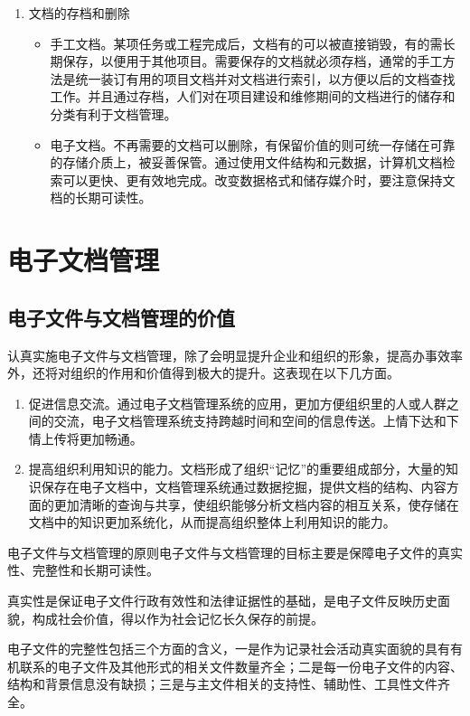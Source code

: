 \begin{enumerate}
    \item 文档的存档和删除
        \begin{itemize}
            \item  手工文档。某项任务或工程完成后，文档有的可以被直接销毁，有的需长期保存，以便用于其他项目。需要保存的文档就必须存档，通常的手工方法是统一装订有用的项目文档并对文档进行索引，以方便以后的文档查找工作。并且通过存档，人们对在项目建设和维修期间的文档进行的储存和分类有利于文档管理。
            \item  电子文档。不再需要的文档可以删除，有保留价值的则可统一存储在可靠的存储介质上，被妥善保管。通过使用文件结构和元数据，计算机文档检索可以更快、更有效地完成。改变数据格式和储存媒介时，要注意保持文档的长期可读性。
        \end{itemize}
    \end{enumerate}

\section {电子文档管理}

\subsection {电子文件与文档管理的价值}

    认真实施电子文件与文档管理，除了会明显提升企业和组织的形象，提高办事效率外，还将对组织的作用和价值得到极大的提升。这表现在以下几方面。

    \begin{enumerate}
        \item 促进信息交流。通过电子文档管理系统的应用，更加方便组织里的人或人群之间的交流，电子文档管理系统支持跨越时间和空间的信息传送。上情下达和下情上传将更加畅通。

        \item 提高组织利用知识的能力。文档形成了组织“记忆”的重要组成部分，大量的知识保存在电子文档中，文档管理系统通过数据挖掘，提供文档的结构、内容方面的更加清晰的查询与共享，使组织能够分析文档内容的相互关系，使存储在文档中的知识更加系统化，从而提高组织整体上利用知识的能力。
    \end{enumerate}

    电子文件与文档管理的原则电子文件与文档管理的目标主要是保障电子文件的真实性、完整性和长期可读性。

    真实性是保证电子文件行政有效性和法律证据性的基础，是电子文件反映历史面貌，构成社会价值，得以作为社会记忆长久保存的前提。

    电子文件的完整性包括三个方面的含义，一是作为记录社会活动真实面貌的具有有机联系的电子文件及其他形式的相关文件数量齐全；二是每一份电子文件的内容、结构和背景信息没有缺损；三是与主文件相关的支持性、辅助性、工具性文件齐全。

